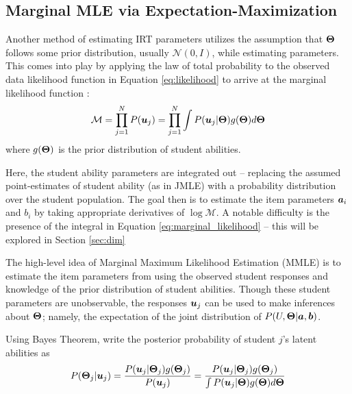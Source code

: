 \subsection{Marginal MLE via Expectation-Maximization}\label{sec:em}
Another method of estimating IRT parameters utilizes the assumption that $\boldsymbol{\Theta}$ follows some prior distribution, usually $\mathcal{N}(0,I)$, while estimating parameters. This comes into play by applying the law of total probability to the observed data likelihood function in Equation \ref{eq:likelihood} to arrive at the marginal likelihood function \cite{baker_kim2004}:
\begin{equation}
  \mathcal{M} = \prod_{j=1}^N P(\boldsymbol{u}_j) = \prod_{j=1}^N \int P(\boldsymbol{u}_j | \boldsymbol{\Theta}) g(\boldsymbol{\Theta}) d\boldsymbol{\Theta}
  \label{eq:marginal_likelihood}
\end{equation}
where $g(\boldsymbol{\Theta})$ is the prior distribution of student abilities.

Here, the student ability parameters are integrated out -- replacing the assumed point-estimates of student ability (as in JMLE) with a probability distribution over the student population. The goal then is to estimate the item parameters $\boldsymbol{a}_i$ and $b_i$ by taking appropriate derivatives of $\log \mathcal{M}$. A notable difficulty is the presence of the integral in Equation \ref{eq:marginal_likelihood} -- this will be explored in Section \ref{sec:dim}

The high-level idea of Marginal Maximum Likelihood Estimation (MMLE) is to estimate the item parameters from using the observed student responses and knowledge of the prior distribution of student abilities. Though these student parameters are unobservable, the responses $\boldsymbol{u}_j$ can be used to make inferences about $\boldsymbol{\Theta}$; namely, the expectation of the joint distribution of $P(U, \boldsymbol{\Theta} | \boldsymbol{a}, \boldsymbol{b})$.

Using Bayes Theorem, write the posterior probability of student $j$'s latent abilities as
\begin{equation}
  P(\boldsymbol{\Theta}_j | \boldsymbol{u}_j) = \frac{P(\boldsymbol{u}_j | \boldsymbol{\Theta}_j) g(\boldsymbol{\Theta}_j)}{P(\boldsymbol{u}_j)} = \frac{P(\boldsymbol{u}_j | \boldsymbol{\Theta}_j) g(\boldsymbol{\Theta}_j)}{\int P(\boldsymbol{u}_j | \boldsymbol{\Theta})g(\boldsymbol{\Theta})d \boldsymbol{\Theta}}
  \label{eq:bayes}
\end{equation}



